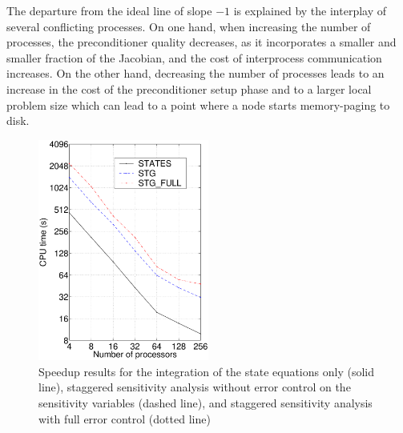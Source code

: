 The departure from the ideal line of slope $-1$ is explained by the 
interplay of several conflicting processes. On one hand, when increasing the 
number of processes, the preconditioner quality decreases, as it incorporates 
a smaller and smaller fraction of the Jacobian, and the cost of interprocess 
communication increases. On the other hand, decreasing the number of processes
leads to an increase in the cost of the preconditioner setup phase and to a larger
local problem size which can lead to a point where a node starts memory-paging
to disk.
\begin{figure}
  {\centerline{\includegraphics[width=0.5\textwidth]{pvfktTest}}}
  \caption[Speedup results on a sensitivity problem]
  {Speedup results for the integration of the state equations only
    (solid line), staggered sensitivity analysis without
    error control on the sensitivity variables (dashed line),
    and staggered sensitivity analysis with full error control (dotted line)}
  \label{f:pvfktTest}
\end{figure}

